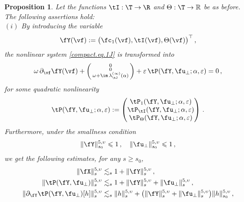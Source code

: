 \documentclass[a4paper,reqno,10pt]{article}
\newtheorem{pro}{Proposition}[section]
\newcommand{\pa}{\partial}
\begin{document}
\begin{pro}\label{prop.AA}
	Let the functions $\tI:\T\to\R$ and $\Theta:\T\to\mathbb{R}$ be as before. The following assertions hold:
	\\[1mm]
	\noindent $(i)$ 
    By introducing  the variable
	\begin{equation}
		\fY(\vf):= \big( \fc_{1}(\vf), \tI(\vf),\Theta(\vf) \big)^\top \,,
	\end{equation}
	the nonlinear system \eqref{compact.eq.1J} is transformed into
	\begin{equation}\label{compact.aa.sys}
		\omega\,\pa_{\vf}\fY(\vf) +\bigg(\begin{smallmatrix}
			0 \\ 0 \\ \omega+\im\,\lambda_{\tJ}^{(\infty)}(\alpha)
		\end{smallmatrix} \bigg)+ \varepsilon \, \tP(\fY,\fu_{\perp};\alpha,\varepsilon) = 0\,, 
	\end{equation}
	for some quadratic nonlinearity
	\begin{equation}
		\tP(\fY,\fu_{\perp};\alpha,\varepsilon) :=\begin{pmatrix}
			\tP_{1}(\fY,\fu_{\perp};\alpha,\varepsilon) \\ \tP_{\tI}(\fY,\fu_{\perp};\alpha,\varepsilon) \\ \tP_{\Theta}(\fY,\fu_{\perp};\alpha,\varepsilon)
		\end{pmatrix}\,.
	\end{equation}
	Furthermore, under the smallness condition
    $$
    \| \fY\|_{s_0}^{5,\upsilon} \leqslant 1\,, \quad  \| \fu_{\perp}\|_{s_0}^{5,\upsilon} \leqslant1 \,,
    $$
    we get the following estimates, for any $s\geq s_0$,
	\begin{equation}\label{quad.est.AA}
	    \begin{aligned}
        \| \fX \|_{s}^{5,\upsilon}&  \lesssim_{s}
        1+\|\fY \|_{s}^{5,\upsilon}  \,,   \\
			\| \tP(\fY,\fu_{\perp}) \|_{s}^{5,\upsilon} &  \lesssim_{s}   1 +	\| \fY \|_{s}^{5,\upsilon} + 	\| \fu_{\perp} \|_{s}^{5,\upsilon}  \,, \\
				\| \pa_{\fY}\tP(\fY,\fu_{\perp})[h] \|_{s}^{5,\upsilon} &\lesssim_{s} \| h \|_{s}^{5,\upsilon}+  \big(  \| \fY\|_{s}^{5,\upsilon} + \| \fu_{\perp}\|_{s}^{5,\upsilon} \big) \| h \|_{s_0}^{5,\upsilon} \,, \\

\end{aligned}
\end{equation}
\end{pro}
\end{document}
